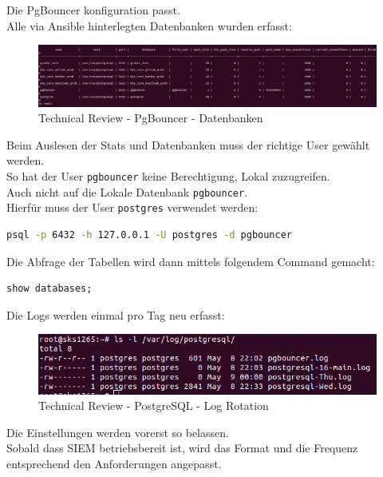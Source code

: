 \begin{flushleft}
    Die PgBouncer konfiguration passt.\\
    Alle via \Gls{Ansible} hinterlegten Datenbanken wurden erfasst:
    \begin{figure}[H]
        \centering
        \includegraphics[width=1\linewidth]{source/implementation/construction_implementation/technical_review/pgbouncer_databases}
        \caption{Technical Review - PgBouncer - Datenbanken}
        \label{fig:pgbouncer_databases}
    \end{figure}
    Beim Auslesen der Stats und Datenbanken muss der richtige User gewählt werden.\\
    So hat der User \texttt{pgbouncer} keine Berechtigung, Lokal zuzugreifen.\\
    Auch nicht auf die Lokale Datenbank \texttt{pgbouncer}.\\
    Hierfür muss der User \texttt{postgres} verwendet werden:
\lstset{style=gra_codestyle}
\begin{lstlisting}[language=bash, caption=PgBouncer - Connect,captionpos=b,label={lst:pgbouncer_connect},breaklines=true]
psql -p 6432 -h 127.0.0.1 -U postgres -d pgbouncer
\end{lstlisting}
    Die Abfrage der Tabellen wird dann mittels folgendem Command gemacht:
\lstset{style=gra_codestyle}
\begin{lstlisting}[language=sql, caption=PgBouncer - Databases,captionpos=b,label={lst:pgbouncer_list_databases},breaklines=true]
show databases;
\end{lstlisting}
\end{flushleft}
\begin{flushleft}
    Die Logs werden einmal pro Tag neu erfasst:
    \begin{figure}[H]
        \centering
        \includegraphics[width=1\linewidth]{source/implementation/construction_implementation/technical_review/postgresql_log_rotation}
        \caption{Technical Review - PostgreSQL - Log Rotation}
        \label{fig:postgresql_log_rotation}
    \end{figure}
    Die Einstellungen werden vorerst so belassen.\\
    Sobald dass \Gls{SIEM} betriebsbereit ist, wird das Format und die Frequenz entsprechend den Anforderungen angepasst.
\end{flushleft}